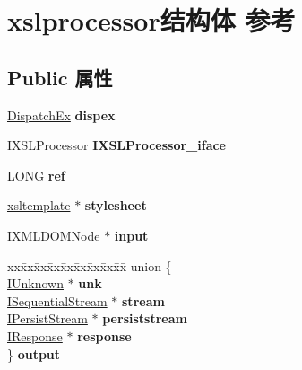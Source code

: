 \hypertarget{structxslprocessor}{}\section{xslprocessor结构体 参考}
\label{structxslprocessor}
\subsection*{Public 属性}
\begin{DoxyCompactItemize}
\item 
\mbox{\label{structxslprocessor_af97b7fcfe71a5b3a9ee36887e7bd418c}} 
\hyperlink{struct_dispatch_ex}{Dispatch\+Ex} {\bfseries dispex}
\item 
\mbox{\label{structxslprocessor_a95cb272d027ca08e044ca74e8eca9f81}} 
I\+X\+S\+L\+Processor {\bfseries I\+X\+S\+L\+Processor\+\_\+iface}
\item 
\mbox{\label{structxslprocessor_a09d38818e1fe7b08eca8b67878ca5ff0}} 
L\+O\+NG {\bfseries ref}
\item 
\mbox{\label{structxslprocessor_a4abc881ac9a9ae9b9b3d46940aa62964}} 
\hyperlink{structxsltemplate}{xsltemplate} $\ast$ {\bfseries stylesheet}
\item 
\mbox{\label{structxslprocessor_ab924d2bf2c2e1d9886abcf122e33084f}} 
\hyperlink{interface_i_x_m_l_d_o_m_node}{I\+X\+M\+L\+D\+O\+M\+Node} $\ast$ {\bfseries input}
\item 
\mbox{\label{structxslprocessor_a026c4e8db5acfee17919ea2c7c7f45b8}} 
\begin{tabbing}
xx\=xx\=xx\=xx\=xx\=xx\=xx\=xx\=xx\=\kill
union \{\\
\>\hyperlink{interface_i_unknown}{IUnknown} $\ast$ {\bfseries unk}\\
\>\hyperlink{interface_i_sequential_stream}{ISequentialStream} $\ast$ {\bfseries stream}\\
\>\hyperlink{interface_i_persist_stream}{IPersistStream} $\ast$ {\bfseries persiststream}\\
\>\hyperlink{interface_i_response}{IResponse} $\ast$ {\bfseries response}\\
\} {\bfseries output}\\


\end{tabbing}
\end{DoxyCompactItemize}
